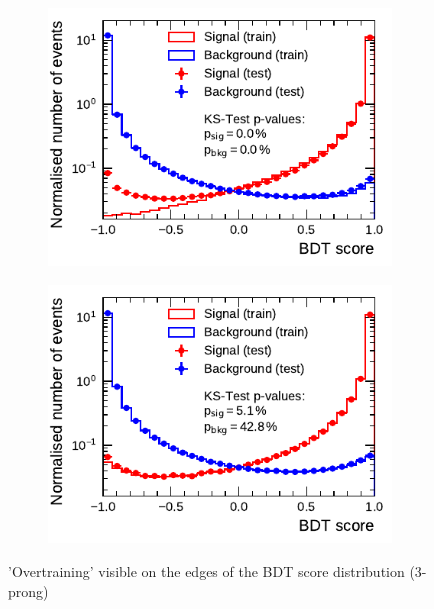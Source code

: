 \begin{figure}[ht]
  \begin{subfigure}[t]{0.48\textwidth}
    \centering
    \includegraphics{./figures/bdt_perf/scores/grid_3p0317.pdf}
  \end{subfigure}\hfill
  \begin{subfigure}[t]{0.48\textwidth}
    \centering
    \includegraphics{./figures/bdt_perf/scores/grid_3p0327.pdf}
  \end{subfigure}
  \caption{'Overtraining' visible on the edges of the BDT score distribution
    (3-prong)}
  \label{fig:bdt_3p_scores}
\end{figure}

